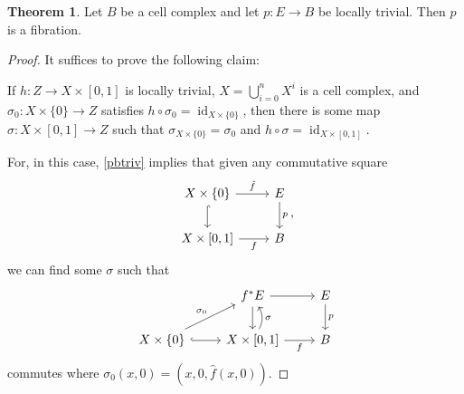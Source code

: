 \documentclass[10pt,letterpaper,cm]{nupset}
\theoremstyle{definition}
\theoremstyle{theorem}
\newtheorem{theorem}[defn]{Theorem}
\theoremstyle{remark}
\newcommand{\1}{\mathbb{1}}
\newcommand{\0}{\vec 0}
\DeclareMathOperator{\id}{id}
\begin{document}
\begin{theorem}
Let $B$ be a cell complex and let $p : E \to B$ be locally trivial. Then $p$ is a fibration. 
\end{theorem}
\begin{proof}
It suffices to prove the following claim: 
\begin{addmargin}[1em]{2em}

\smallskip

If $h : Z \to X \times [0,1]$ is locally trivial, $X = \bigcup_{i=0}^n X^i$ is a cell complex, and $\sigma_0 : X \times \{0\} \to Z$ satisfies $h \circ \sigma_0 = \id_{X \times \{0\}}$, then there is some map $\sigma : X \times [0,1] \to Z$ such that $\sigma_{X \times \{0\}} = \sigma_0$ and $h \circ \sigma = \id_{X \times [0,1]}$.
\end{addmargin}

\smallskip

For, in this case, \cref{pbtriv} implies that given any commutative square
\[
\begin{tikzcd}
X \times \{0\} \arrow[d, hook] \arrow[r, "\hat{f}"] & E \arrow[d, "p"] \\
{X \times [0,1]} \arrow[r, "f"']                    & B               
\end{tikzcd}
,\] we can find some $\sigma$ such that
\[
\begin{tikzcd}
                                                      & f^{\ast}{E} \arrow[r] \arrow[d]                                   & E \arrow[d, "p"] \\
X \times \{0\} \arrow[ru, "\sigma_0"] \arrow[r, hook] & {X \times [0,1]} \arrow[r, "f"'] \arrow[u, "\sigma"', bend right] & B               
\end{tikzcd}
\] commutes where $\sigma_0(x,0) = \left(x,0, \hat{f}(x,0)\right)$.

\medskip


\end{proof}
\end{document}
